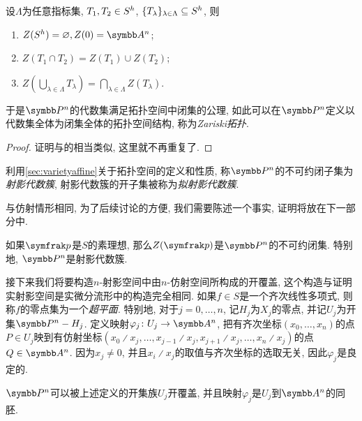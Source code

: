 \begin{proposition}
  设$\Lambda$为任意指标集, $T_1, T_2\in S^h$, $\{T_\lambda\}_{\lambda\in\Lambda}\subseteq S^h$, 则
  \begin{enumerate}
    \item $Z(\Shomo)=\varnothing, Z(0)=\AF^n$;
    \item $Z(T_1\cap T_2)=Z(T_1)\cup Z(T_2)$;
    \item $Z(\bigcup_{\lambda\in\Lambda} T_\lambda)=\bigcap_{\lambda\in\Lambda} Z(T_\lambda)$.
  \end{enumerate}
  于是$\PP^n$的代数集满足拓扑空间中闭集的公理, 如此可以在$\PP^n$定义以代数集全体为闭集全体的拓扑空间结构, 称为\emph{Zariski拓扑}.
\end{proposition}

\begin{proof}
  证明与的相当类似, 这里就不再重复了.
\end{proof}

\begin{definition}
  利用\ref{sec:varietyaffine}关于拓扑空间的定义和性质, 称$\PP^n$的不可约闭子集为\emph{射影代数簇}, 射影代数簇的开子集被称为\emph{拟射影代数簇}.
\end{definition}

与仿射情形相同, 为了后续讨论的方便, 我们需要陈述一个事实, 证明将放在下一部分中.

\begin{proposition}\label{prop:projectiveprimeirreducible}
  如果$\ideal{p}$是$S$的素理想, 那么$Z(\ideal{p})$是$\PP^n$的不可约闭集. 特别地, $\PP^n$是射影代数簇.
\end{proposition}

接下来我们将要构造$n$-射影空间中由$n$-仿射空间所构成的开覆盖, 这个构造与证明实射影空间是实微分流形中的构造\parencite[4--5, Definition 2.4]{flaherty_riemannian_1992}完全相同. 如果$f\in S$是一个齐次线性多项式, 则称$f$的零点集为一个\emph{超平面}. 特别地, 对于$j=0, \dotsc, n$, 记$H_j$为$X_j$的零点, 并记$U_j$为开集$\PP^n-H_j$. 定义映射$\varphi_j\colon U_j\to \AF^n$, 把有齐次坐标$(x_0, \dotsc, x_n)$的点$P\in U_j$映到有仿射坐标$(x_0{\divslash}x_j, \dotsc, x_{j-1}{\divslash}x_j, x_{j+1}{\divslash}x_j, \dotsc,  x_n{\divslash}x_j)$的点$Q\in \AF^n$. 因为$x_j\neq 0$, 并且$x_i{\divslash}x_j$的取值与齐次坐标的选取无关, 因此$\varphi_j$是良定的.

\begin{proposition}\label{prop:projspaceopencoverhomeo}
  $\PP^n$可以被上述定义的开集族$U_j$开覆盖, 并且映射$\varphi_j$是$U_j$到$\AF^n$的同胚.
\end{proposition}

